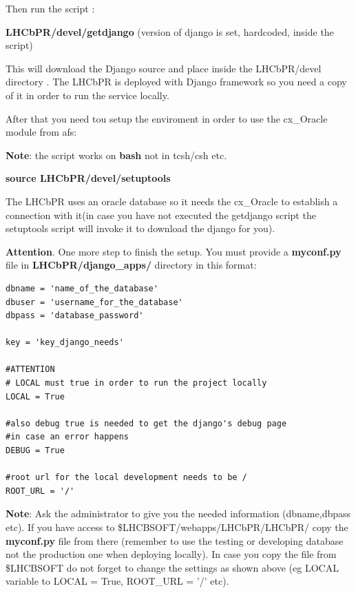 \documentclass{lhcbnote}
\begin{document}
\vspace{2 mm}

Then run the script :

\vspace{2 mm}


{\bf LHCbPR/devel/getdjango} (version of django is set, hardcoded, inside the script)

\vspace{2 mm}

This will download the Django source and place inside the LHCbPR/devel directory . 
The LHCbPR is deployed with Django framework so you need a copy of it in order to 
run the service locally.

After that you need tou setup the enviroment in order to use the cx\_Oracle module from afs:

{\bf Note}: the script works on {\bf bash} not in tcsh/csh etc.
\vspace{2 mm}

{\bf source LHCbPR/devel/setuptools}

\vspace{2 mm}

The LHCbPR uses an oracle database
so it needs the cx\_Oracle to establish a connection with it(in case you have not executed the getdjango script the setuptools script will invoke it to download the django for you).

{\bf Attention}. One more step to finish the setup. You must provide a {\bf myconf.py}
file in {\bf LHCbPR/django\_apps/} directory in this format:

\begin{verbatim}
dbname = 'name_of_the_database'
dbuser = 'username_for_the_database'
dbpass = 'database_password'

key = 'key_django_needs'

#ATTENTION
# LOCAL must true in order to run the project locally
LOCAL = True

#also debug true is needed to get the django's debug page
#in case an error happens
DEBUG = True

#root url for the local development needs to be /
ROOT_URL = '/'
\end{verbatim}

{\bf Note}: Ask the administrator to give you the needed information (dbname,dbpass etc). If you have access 
to {\$LHCBSOFT/webapps/LHCbPR/LHCbPR/} copy the {\bf myconf.py} file from there (remember to use the testing or developing database not the production one when 
deploying locally). In case you copy the file from \$LHCBSOFT do not forget to change the settings as shown above (eg  LOCAL variable to LOCAL = True, ROOT\_URL = '/' etc). 
\end{document}
